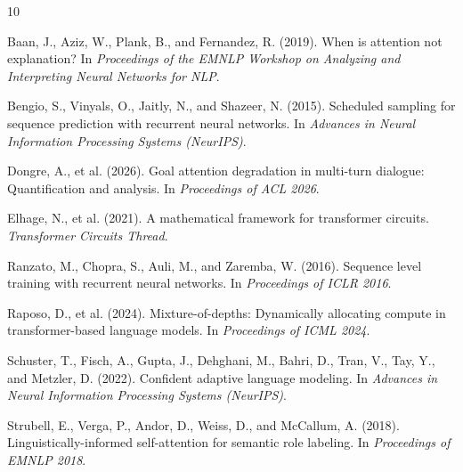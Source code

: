 \documentclass[11pt,a4paper]{article}
\begin{document}


\begin{thebibliography}{10}

Baan, J., Aziz, W., Plank, B., and Fernandez, R. (2019).
\newblock When is attention not explanation?
\newblock In \emph{Proceedings of the EMNLP Workshop on Analyzing and Interpreting Neural Networks for NLP}.

Bengio, S., Vinyals, O., Jaitly, N., and Shazeer, N. (2015).
\newblock Scheduled sampling for sequence prediction with recurrent neural networks.
\newblock In \emph{Advances in Neural Information Processing Systems (NeurIPS)}.

Dongre, A., et al. (2026).
\newblock Goal attention degradation in multi-turn dialogue: Quantification and analysis.
\newblock In \emph{Proceedings of ACL 2026}.

Elhage, N., et al. (2021).
\newblock A mathematical framework for transformer circuits.
\newblock \emph{Transformer Circuits Thread}.

Ranzato, M., Chopra, S., Auli, M., and Zaremba, W. (2016).
\newblock Sequence level training with recurrent neural networks.
\newblock In \emph{Proceedings of ICLR 2016}.

Raposo, D., et al. (2024).
\newblock Mixture-of-depths: Dynamically allocating compute in transformer-based language models.
\newblock In \emph{Proceedings of ICML 2024}.

Schuster, T., Fisch, A., Gupta, J., Dehghani, M., Bahri, D., Tran, V., Tay, Y., and Metzler, D. (2022).
\newblock Confident adaptive language modeling.
\newblock In \emph{Advances in Neural Information Processing Systems (NeurIPS)}.

Strubell, E., Verga, P., Andor, D., Weiss, D., and McCallum, A. (2018).
\newblock Linguistically-informed self-attention for semantic role labeling.
\newblock In \emph{Proceedings of EMNLP 2018}.

\end{thebibliography}
\end{document}
